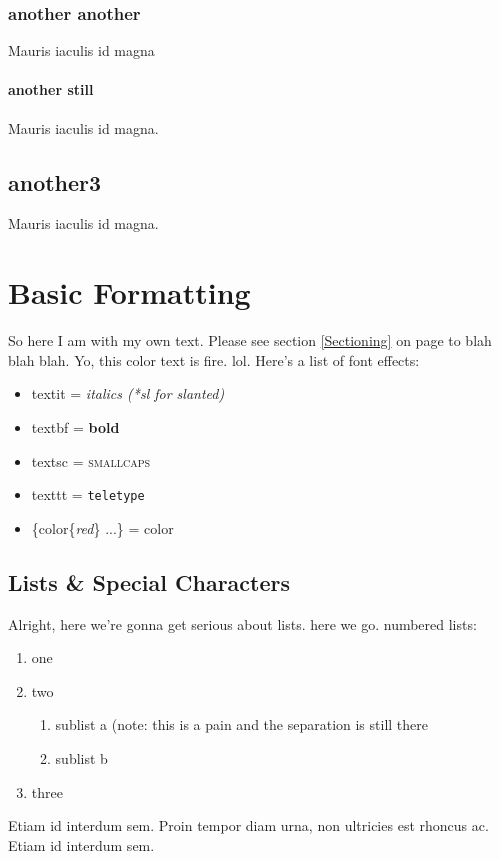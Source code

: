 \documentclass[a4paper,12pt]{article} %
\begin{document}
\subsubsection{another another}
Mauris iaculis id magna
\paragraph{another still}
Mauris iaculis id magna. 


\subsection{another3}
Mauris iaculis id magna.

\section{Basic Formatting} \label{Basic Formatting}
So here I am with my own text. Please see section \ref{Sectioning} on page \pageref{Basic Formatting} to blah blah blah. Yo, this color text is {\color{red}fire}. lol. Here's a list of font effects:
\begin{itemize}
\itemsep=-0.5em %
\item textit = \textit{italics (*sl for \textsl{slanted})}
\item textbf = \textbf{bold}
\item textsc = \textsc{smallcaps}
\item texttt = \texttt{teletype}
\item \{color\{\textit{red}\} ...\} = {\color{red} color}
\end{itemize}

\subsection{Lists \& Special Characters}
Alright, here we're gonna get serious about lists. here we go. numbered lists:
\begin{enumerate}
\itemsep=-0.5em %
\item one
\item two
\begin{enumerate}
\item sublist a (note: this is a pain and the separation is still there
\item sublist b
\end{enumerate}
\item three
\end{enumerate}
Etiam id interdum sem. Proin tempor diam urna, non ultricies est rhoncus ac. Etiam id interdum sem.
\end{document}
